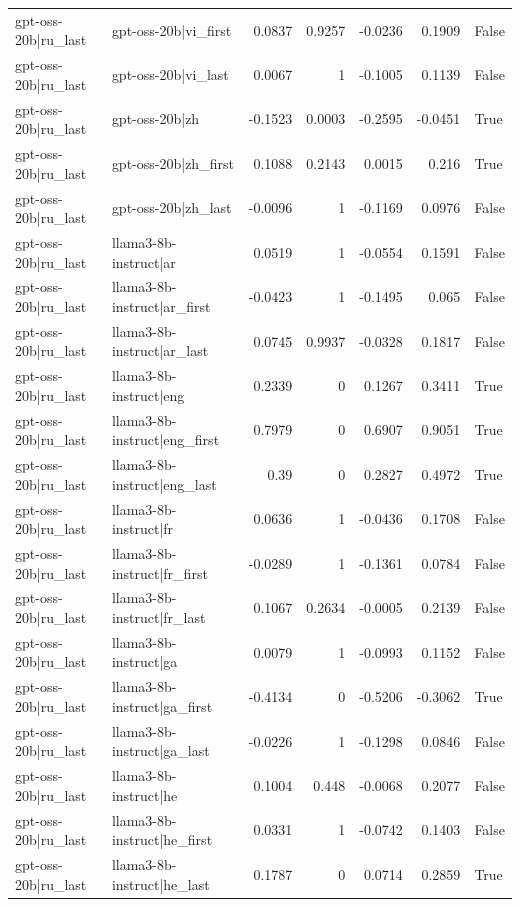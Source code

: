 \begin{table}
\begin{tabular}{l l r r r r l}
gpt-oss-20b|ru_last & gpt-oss-20b|vi_first & 0.0837 & 0.9257 & -0.0236 & 0.1909 & False \\
gpt-oss-20b|ru_last & gpt-oss-20b|vi_last & 0.0067 & 1 & -0.1005 & 0.1139 & False \\
gpt-oss-20b|ru_last & gpt-oss-20b|zh & -0.1523 & 0.0003 & -0.2595 & -0.0451 & True \\
gpt-oss-20b|ru_last & gpt-oss-20b|zh_first & 0.1088 & 0.2143 & 0.0015 & 0.216 & True \\
gpt-oss-20b|ru_last & gpt-oss-20b|zh_last & -0.0096 & 1 & -0.1169 & 0.0976 & False \\
gpt-oss-20b|ru_last & llama3-8b-instruct|ar & 0.0519 & 1 & -0.0554 & 0.1591 & False \\
gpt-oss-20b|ru_last & llama3-8b-instruct|ar_first & -0.0423 & 1 & -0.1495 & 0.065 & False \\
gpt-oss-20b|ru_last & llama3-8b-instruct|ar_last & 0.0745 & 0.9937 & -0.0328 & 0.1817 & False \\
gpt-oss-20b|ru_last & llama3-8b-instruct|eng & 0.2339 & 0 & 0.1267 & 0.3411 & True \\
gpt-oss-20b|ru_last & llama3-8b-instruct|eng_first & 0.7979 & 0 & 0.6907 & 0.9051 & True \\
gpt-oss-20b|ru_last & llama3-8b-instruct|eng_last & 0.39 & 0 & 0.2827 & 0.4972 & True \\
gpt-oss-20b|ru_last & llama3-8b-instruct|fr & 0.0636 & 1 & -0.0436 & 0.1708 & False \\
gpt-oss-20b|ru_last & llama3-8b-instruct|fr_first & -0.0289 & 1 & -0.1361 & 0.0784 & False \\
gpt-oss-20b|ru_last & llama3-8b-instruct|fr_last & 0.1067 & 0.2634 & -0.0005 & 0.2139 & False \\
gpt-oss-20b|ru_last & llama3-8b-instruct|ga & 0.0079 & 1 & -0.0993 & 0.1152 & False \\
gpt-oss-20b|ru_last & llama3-8b-instruct|ga_first & -0.4134 & 0 & -0.5206 & -0.3062 & True \\
gpt-oss-20b|ru_last & llama3-8b-instruct|ga_last & -0.0226 & 1 & -0.1298 & 0.0846 & False \\
gpt-oss-20b|ru_last & llama3-8b-instruct|he & 0.1004 & 0.448 & -0.0068 & 0.2077 & False \\
gpt-oss-20b|ru_last & llama3-8b-instruct|he_first & 0.0331 & 1 & -0.0742 & 0.1403 & False \\
gpt-oss-20b|ru_last & llama3-8b-instruct|he_last & 0.1787 & 0 & 0.0714 & 0.2859 & True \\

\end{tabular}
\end{table}
